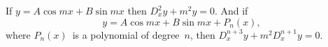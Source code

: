 If $y = A\cos mx + B\sin mx$ then $D_{x}^{2} y + m^{2} y = 0$. And if
\[
y = A\cos mx + B\sin mx + P_{n}(x),
\]
where $P_{n}(x)$~is a polynomial of degree~$n$, then $D_{x}^{n+3} y + m^{2} D_{x}^{n+1} y = 0$.


